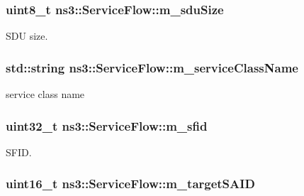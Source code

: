 \subsubsection[{\texorpdfstring{m\+\_\+sdu\+Size}{m_sduSize}}]{\setlength{\rightskip}{0pt plus 5cm}uint8\+\_\+t ns3\+::\+Service\+Flow\+::m\+\_\+sdu\+Size\hspace{0.3cm}{\ttfamily [private]}}\hypertarget{classns3_1_1ServiceFlow_ac6e5539e9c678970045eb8fe247903e6}{}\label{classns3_1_1ServiceFlow_ac6e5539e9c678970045eb8fe247903e6}


S\+DU size. 

\subsubsection[{\texorpdfstring{m\+\_\+service\+Class\+Name}{m_serviceClassName}}]{\setlength{\rightskip}{0pt plus 5cm}std\+::string ns3\+::\+Service\+Flow\+::m\+\_\+service\+Class\+Name\hspace{0.3cm}{\ttfamily [private]}}\hypertarget{classns3_1_1ServiceFlow_a1edc6872551d75cf65513464475539b1}{}\label{classns3_1_1ServiceFlow_a1edc6872551d75cf65513464475539b1}


service class name 

\subsubsection[{\texorpdfstring{m\+\_\+sfid}{m_sfid}}]{\setlength{\rightskip}{0pt plus 5cm}uint32\+\_\+t ns3\+::\+Service\+Flow\+::m\+\_\+sfid\hspace{0.3cm}{\ttfamily [private]}}\hypertarget{classns3_1_1ServiceFlow_ae39adff3ec14a28fc308208e56de4f82}{}\label{classns3_1_1ServiceFlow_ae39adff3ec14a28fc308208e56de4f82}


S\+F\+ID. 

\subsubsection[{\texorpdfstring{m\+\_\+target\+S\+A\+ID}{m_targetSAID}}]{\setlength{\rightskip}{0pt plus 5cm}uint16\+\_\+t ns3\+::\+Service\+Flow\+::m\+\_\+target\+S\+A\+ID\hspace{0.3cm}{\ttfamily [private]}}\hypertarget{classns3_1_1ServiceFlow_a0155ea4031007c532c4a206561ec8835}{}\label{classns3_1_1ServiceFlow_a0155ea4031007c532c4a206561ec8835}


